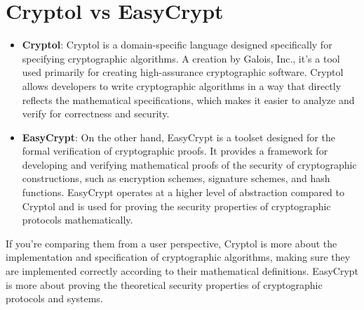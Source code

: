 \section*{Cryptol vs EasyCrypt}
\begin{itemize}
\item \textbf{Cryptol}: Cryptol is a domain-specific language designed specifically for specifying cryptographic algorithms. A creation by Galois, Inc., it's a tool used primarily for creating high-assurance cryptographic software. Cryptol allows developers to write cryptographic algorithms in a way that directly reflects the mathematical specifications, which makes it easier to analyze and verify for correctness and security.
\item \textbf{EasyCrypt}: On the other hand, EasyCrypt is a toolset designed for the formal verification of cryptographic proofs. It provides a framework for developing and verifying mathematical proofs of the security of cryptographic constructions, such as encryption schemes, signature schemes, and hash functions. EasyCrypt operates at a higher level of abstraction compared to Cryptol and is used for proving the security properties of cryptographic protocols mathematically.
\end{itemize}

If you're comparing them from a user perspective, Cryptol is more about the implementation and specification of cryptographic algorithms, making sure they are implemented correctly according to their mathematical definitions. EasyCrypt is more about proving the theoretical security properties of cryptographic protocols and systems.